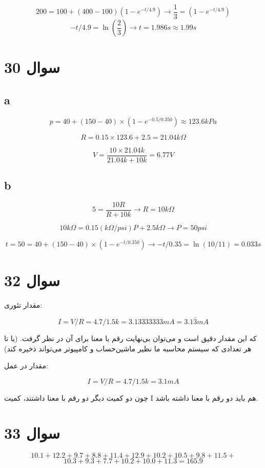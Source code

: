 \documentclass[12pt]{article}
\begin{document}
$$200 = 100 + (400 - 100)(1 - e^{-t/4.9}) \rightarrow \frac{1}{3} = (1 - e^{-t/4.9})$$
$$-t/4.9 = \ln(\frac{2}{3}) \rightarrow t = 1.986 s \approx 1.99 s$$

\section*{سوال 30}

\subsection*{a}
$$p = 40 + (150 - 40) \times (1 - e^{-0.5/0.350 }) \approx 123.6 kPa$$

$$R = 0.15 \times 123.6 +2.5 =  21.04 k\Omega$$

$$V = \frac{10 \times 21.04 k}{21.04 k + 10k} = 6.77 V $$

\subsection*{b}

$$5 = \frac{10 R}{R + 10 k} \rightarrow R = 10 k\Omega$$

$$10 k\Omega = 0.15 (k\Omega/psi)P + 2.5 k\Omega \rightarrow P = 50 psi $$

$$t= 50 = 40 + (150 -40) \times (1 - e^{-t/0.350 }) \rightarrow -t/0.35 = \ln(10/11) = 0.033 s$$


\section*{سوال 32}

مقدار تئوری:

$$I = V/R = 4.7 / 1.5k = 3.13333333 mA = 3.1\bar{3} mA$$ 

که این مقدار دقیق است و  می‌توان بی‌نهایت رقم با معنا برای آن در نظر گرفت. (یا تا هر تعدادی که سیستم محاسبه ما نظیر ماشین‌حساب و کامپیوتر می‌تواند ذخیره کند)


مقدار در عمل:

$$I = V/R = 4.7 / 1.5k = 3.1 mA$$

چون دو کمیت دیگر دو رقم با معنا داشتند، کمیت I هم باید دو رقم با معنا داشته باشد.


\section*{سوال 33}

$$10.1 + 12.2 + 9.7 + 8.8 + 11.4 + 12.9 + 10.2 + 10.5 + 9.8 + 11.5 +$$
$$10.3 + 9.3 + 7.7 + 10.2 + 10.0 + 11.3 = 165.9$$
\end{document}
